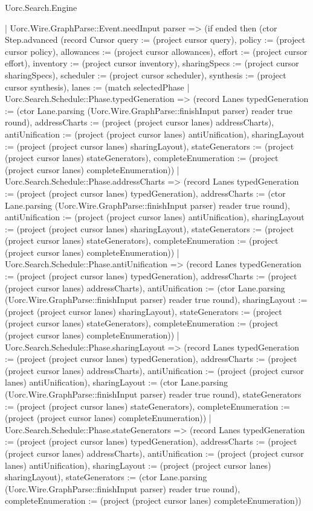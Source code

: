 \begin{lexlean}{Uorc.Search.Engine}
\begin{semanticmodule}
{      | Uorc.Wire.GraphParse::Event.needInput parser => (if ended then (ctor Step.advanced (record Cursor {query := (project cursor query), policy := (project cursor policy), allowances := (project cursor allowances), effort := (project cursor effort), inventory := (project cursor inventory), sharingSpecs := (project cursor sharingSpecs), scheduler := (project cursor scheduler), synthesis := (project cursor synthesis), lanes := (match selectedPhase
        | Uorc.Search.Schedule::Phase.typedGeneration => (record Lanes {typedGeneration := (ctor Lane.parsing (Uorc.Wire.GraphParse::finishInput parser) reader true round), addressCharts := (project (project cursor lanes) addressCharts), antiUnification := (project (project cursor lanes) antiUnification), sharingLayout := (project (project cursor lanes) sharingLayout), stateGenerators := (project (project cursor lanes) stateGenerators), completeEnumeration := (project (project cursor lanes) completeEnumeration)})
        | Uorc.Search.Schedule::Phase.addressCharts => (record Lanes {typedGeneration := (project (project cursor lanes) typedGeneration), addressCharts := (ctor Lane.parsing (Uorc.Wire.GraphParse::finishInput parser) reader true round), antiUnification := (project (project cursor lanes) antiUnification), sharingLayout := (project (project cursor lanes) sharingLayout), stateGenerators := (project (project cursor lanes) stateGenerators), completeEnumeration := (project (project cursor lanes) completeEnumeration)})
        | Uorc.Search.Schedule::Phase.antiUnification => (record Lanes {typedGeneration := (project (project cursor lanes) typedGeneration), addressCharts := (project (project cursor lanes) addressCharts), antiUnification := (ctor Lane.parsing (Uorc.Wire.GraphParse::finishInput parser) reader true round), sharingLayout := (project (project cursor lanes) sharingLayout), stateGenerators := (project (project cursor lanes) stateGenerators), completeEnumeration := (project (project cursor lanes) completeEnumeration)})
        | Uorc.Search.Schedule::Phase.sharingLayout => (record Lanes {typedGeneration := (project (project cursor lanes) typedGeneration), addressCharts := (project (project cursor lanes) addressCharts), antiUnification := (project (project cursor lanes) antiUnification), sharingLayout := (ctor Lane.parsing (Uorc.Wire.GraphParse::finishInput parser) reader true round), stateGenerators := (project (project cursor lanes) stateGenerators), completeEnumeration := (project (project cursor lanes) completeEnumeration)})
        | Uorc.Search.Schedule::Phase.stateGenerators => (record Lanes {typedGeneration := (project (project cursor lanes) typedGeneration), addressCharts := (project (project cursor lanes) addressCharts), antiUnification := (project (project cursor lanes) antiUnification), sharingLayout := (project (project cursor lanes) sharingLayout), stateGenerators := (ctor Lane.parsing (Uorc.Wire.GraphParse::finishInput parser) reader true round), completeEnumeration := (project (project cursor lanes) completeEnumeration)})
}}
\end{semanticmodule}
\end{lexlean}
